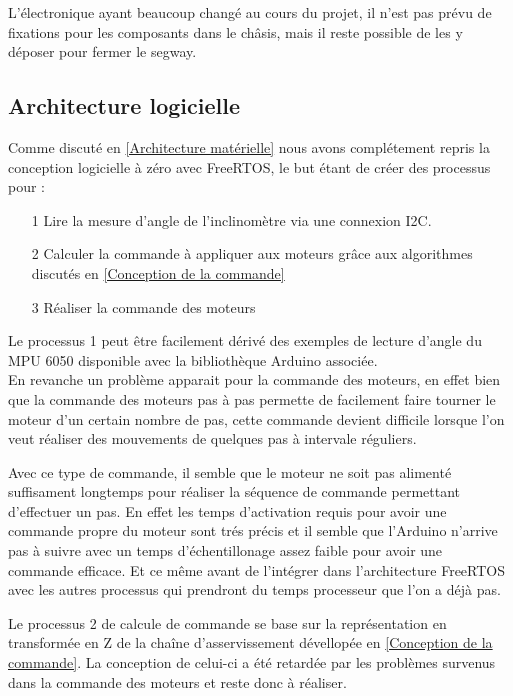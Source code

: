 \documentclass[oneside,a4paper,12pt]{article}
\begin{document}
	L'électronique ayant beaucoup changé au cours du projet, il n'est pas prévu de fixations pour les composants dans le châsis, mais il reste possible de les y déposer pour fermer le segway.
	
	\subsection{Architecture logicielle}
	\label{subsection:Architecture logicielle}
	
	Comme discuté en \ref{Architecture matérielle} nous avons complétement repris la conception logicielle à zéro avec FreeRTOS, le but étant de créer des processus pour :
	
	\begin{itemize}
		\item[1] Lire la mesure d'angle de l'inclinomètre via une connexion I2C.
		\item[2] Calculer la commande à appliquer aux moteurs grâce aux algorithmes discutés en \ref{Conception de la commande}
		\item[3] Réaliser la commande des moteurs
	\end{itemize}
	
	Le processus 1 peut être facilement dérivé des exemples de lecture d'angle du MPU 6050 disponible avec la bibliothèque Arduino associée.\\
	En revanche un problème apparait pour la commande des moteurs, en effet bien que la commande des moteurs pas à pas permette de facilement faire tourner le moteur d'un certain nombre de pas, cette commande devient difficile lorsque l'on veut réaliser des mouvements de quelques pas à intervale réguliers.
	
	Avec ce type de commande, il semble que le moteur ne soit pas alimenté suffisament longtemps pour réaliser la séquence de commande permettant d'effectuer un pas. En effet les temps d'activation requis pour avoir une commande propre du moteur sont trés précis et il semble que l'Arduino n'arrive pas à suivre avec un temps d'échentillonage assez faible pour avoir une commande efficace. Et ce même avant de l'intégrer dans l'architecture FreeRTOS avec les autres processus qui prendront du temps processeur que l'on a déjà pas.
	
	Le processus 2 de calcule de commande se base sur la représentation en transformée en Z de la chaîne d'asservissement dévellopée en \ref{Conception de la commande}. La conception de celui-ci a été retardée par les problèmes survenus dans la commande des moteurs et reste donc à réaliser.
	
\end{document}
